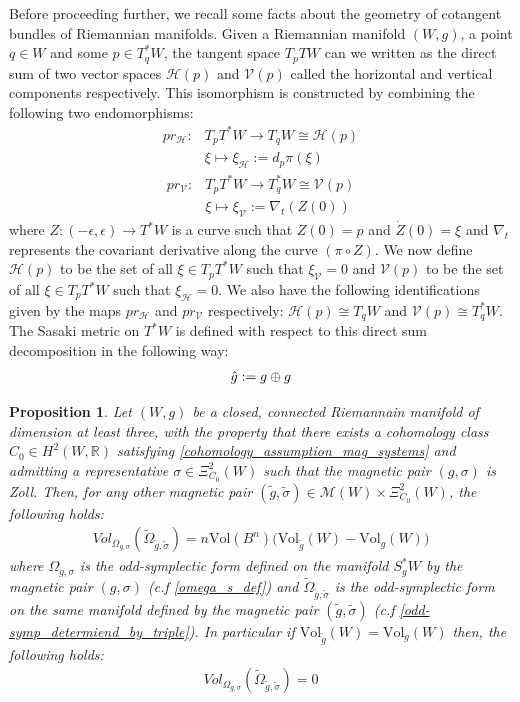 \documentclass[11pt]{amsart}
\theoremstyle{plain}
\newtheorem{proposition}[theorem]{Proposition}
\theoremstyle{definition}
\theoremstyle{remark}
\begin{document}
Before proceeding further, we recall some facts about the geometry of cotangent bundles of Riemannian manifolds. Given a Riemannian manifold $(W,g)$, a point $q \in W$ and some $p \in T_q^*W$, the tangent space $T_{p}TW$ can we written as the direct sum of two vector spaces $\mathcal{H}(p)$ and $\mathcal{V}(p)$ called the horizontal and vertical components respectively. This isomorphism is constructed by combining the following two endomorphisms:
\begin{align}
    pr_{\mathcal{H}}: &T_{p}T^*W \rightarrow T_q W \cong \mathcal{\mathcal{H}}(p)  \\\nonumber
   &\xi \mapsto \xi_{\mathcal{H}} := d_{p}\pi(\xi) 
\end{align}
\begin{align}
    pr_{\mathcal{V}}: &T_{p}T^*W \rightarrow T^*_q W \cong \mathcal{V}(p) \\\nonumber
   &\xi \mapsto \xi_\mathcal{V} := \nabla_{t}(Z(0)) 
\end{align}
where $Z:(-\epsilon, \epsilon) \rightarrow T^*W$ is a curve such that $Z(0) = p$ and $\Dot{Z}(0) = \xi$ and $\nabla_t$ represents the covariant derivative along the curve $(\pi \circ Z)$. We now define $\mathcal{H}(p)$ to be the set of all $\xi \in T_pT^*W$ such that $\xi_{\mathcal{V}} =0$ and $\mathcal{V}(p)$ to be the set of all $\xi \in T_{p}T^*W$ such that $\xi_{\mathcal{H}} =0$. We also have the following identifications given by the maps $pr_{\mathcal{H}}$ and $pr_{\mathcal{V}}$ respectively: $\mathcal{H}(p) \cong T_qW$ and $\mathcal{V}(p) \cong T^*_qW$. The Sasaki metric on $T^*W$ is defined with respect to this direct sum decomposition in the following way:
\begin{align}
    \Hat{g} : = g \oplus g
\end{align}
\begin{proposition}\label{vol_mag_sys_general}
        Let $(W,g)$ be a closed, connected Riemannain manifold of dimension at least three, with the property that there exists a cohomology class $C_0 \in H^2(W,\mathbb{R})$ satisfying \eqref{cohomology_assumption_mag_systems} and admitting a representative $\sigma \in \Xi^2_{C_0}(W)$ such that the magnetic pair $(g,\sigma)$ is Zoll. Then, for any other magnetic pair $(\tilde g,\tilde \sigma) \in \mathcal{M}(W) \times \Xi^2_{C_0}(W)$, the following holds:
        \begin{align}
            Vol_{\Omega_{g,\sigma}}(\tilde \Omega_{\tilde g, \tilde \sigma}) =     n\text{Vol}(B^n) \Big( \text{Vol}_{\tilde g}(W) - \text{Vol}_{g}(W) \Big)
        \end{align}
        where $\Omega_{g,\sigma}$ is the odd-symplectic form defined on the manifold $S_g^*W$ by the magnetic pair $(g,\sigma)$ (c.f \eqref{omega_s_def}) and $\tilde \Omega_{\tilde g,\tilde\sigma}$ is the odd-symplectic form on the same manifold defined by the magnetic pair $(\tilde g,\tilde \sigma)$ (c.f \eqref{odd-symp_determiend_by_triple}). In particular if $\text{Vol}_{\tilde g}(W) = \text{Vol}_{g}(W)$ then, the following holds: \begin{align}
            Vol_{\Omega_{g,\sigma}}(\tilde \Omega_{\tilde g, \tilde \sigma}) =0
        \end{align}
    \end{proposition}
\end{document}
